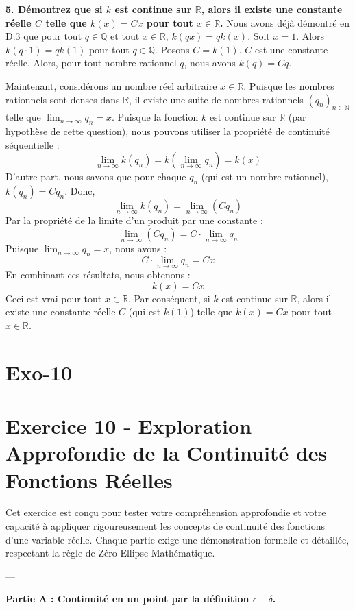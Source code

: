 \documentclass[12pt,a4paper]{report}
\begin{document}
\textbf{5. Démontrez que si $k$ est continue sur $\mathbb{R}$, alors il existe une constante réelle $C$ telle que $k(x) = Cx$ pour tout $x \in \mathbb{R}$.}
Nous avons déjà démontré en D.3 que pour tout $q \in \mathbb{Q}$ et tout $x \in \mathbb{R}$, $k(qx) = qk(x)$.
Soit $x=1$. Alors $k(q \cdot 1) = qk(1)$ pour tout $q \in \mathbb{Q}$.
Posons $C = k(1)$. $C$ est une constante réelle.
Alors, pour tout nombre rationnel $q$, nous avons $k(q) = Cq$.

Maintenant, considérons un nombre réel arbitraire $x \in \mathbb{R}$.
Puisque les nombres rationnels sont denses dans $\mathbb{R}$, il existe une suite de nombres rationnels $(q_n)_{n \in \mathbb{N}}$ telle que $\lim_{n \to \infty} q_n = x$.
Puisque la fonction $k$ est continue sur $\mathbb{R}$ (par hypothèse de cette question), nous pouvons utiliser la propriété de continuité séquentielle :
$$
\lim_{n \to \infty} k(q_n) = k\left(\lim_{n \to \infty} q_n\right) = k(x)
$$
D'autre part, nous savons que pour chaque $q_n$ (qui est un nombre rationnel), $k(q_n) = Cq_n$.
Donc,
$$
\lim_{n \to \infty} k(q_n) = \lim_{n \to \infty} (Cq_n)
$$
Par la propriété de la limite d'un produit par une constante :
$$
\lim_{n \to \infty} (Cq_n) = C \cdot \lim_{n \to \infty} q_n
$$
Puisque $\lim_{n \to \infty} q_n = x$, nous avons :
$$
C \cdot \lim_{n \to \infty} q_n = Cx
$$
En combinant ces résultats, nous obtenons :
$$
k(x) = Cx
$$
Ceci est vrai pour tout $x \in \mathbb{R}$.
Par conséquent, si $k$ est continue sur $\mathbb{R}$, alors il existe une constante réelle $C$ (qui est $k(1)$) telle que $k(x) = Cx$ pour tout $x \in \mathbb{R}$.

\section{Exo-10}
\section{Exercice 10 - Exploration Approfondie de la Continuité des Fonctions Réelles}

Cet exercice est conçu pour tester votre compréhension approfondie et votre capacité à appliquer rigoureusement les concepts de continuité des fonctions d'une variable réelle. Chaque partie exige une démonstration formelle et détaillée, respectant la règle de Zéro Ellipse Mathématique.

---

\textbf{Partie A : Continuité en un point par la définition $\epsilon-\delta$.}
\end{document}
